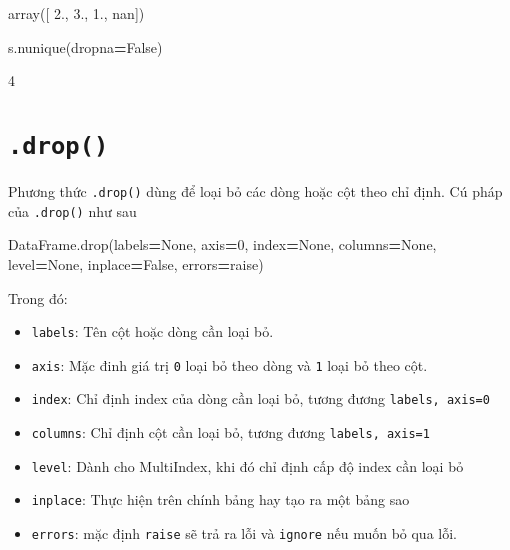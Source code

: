 \documentclass[
]{book}
\newenvironment{Shaded}{\begin{snugshade}}{\end{snugshade}}
\newcommand{\DecValTok}[1]{\textcolor[rgb]{0.00,0.00,0.81}{#1}}
\newcommand{\NormalTok}[1]{#1}
\newcommand{\OperatorTok}[1]{\textcolor[rgb]{0.81,0.36,0.00}{\textbf{#1}}}
\newcommand{\StringTok}[1]{\textcolor[rgb]{0.31,0.60,0.02}{#1}}
\newcommand{\VariableTok}[1]{\textcolor[rgb]{0.00,0.00,0.00}{#1}}
\begin{document}
\begin{Shaded}
\begin{Highlighting}[]
\NormalTok{array([ 2.,  3.,  1., nan])}
\end{Highlighting}
\end{Shaded}

\begin{Shaded}
\begin{Highlighting}[]
\NormalTok{s.nunique(dropna}\OperatorTok{=}\VariableTok{False}\NormalTok{)}
\end{Highlighting}
\end{Shaded}

\begin{Shaded}
\begin{Highlighting}[]
\NormalTok{4}
\end{Highlighting}
\end{Shaded}

\section{\texorpdfstring{\texttt{.drop()}}{.drop()}}\label{drop}

Phương thức \texttt{.drop()} dùng để loại bỏ các dòng hoặc cột theo chỉ định.
Cú pháp của \texttt{.drop()} như sau

\begin{Shaded}
\begin{Highlighting}[]
\NormalTok{DataFrame.drop(labels}\OperatorTok{=}\VariableTok{None}\NormalTok{, axis}\OperatorTok{=}\DecValTok{0}\NormalTok{, index}\OperatorTok{=}\VariableTok{None}\NormalTok{, columns}\OperatorTok{=}\VariableTok{None}\NormalTok{, level}\OperatorTok{=}\VariableTok{None}\NormalTok{, inplace}\OperatorTok{=}\VariableTok{False}\NormalTok{, errors}\OperatorTok{=}\StringTok{\textquotesingle{}raise\textquotesingle{}}\NormalTok{)}
\end{Highlighting}
\end{Shaded}

Trong đó:

\begin{itemize}
\item
  \texttt{labels}: Tên cột hoặc dòng cần loại bỏ.
\item
  \texttt{axis}: Mặc đinh giá trị \texttt{0} loại bỏ theo dòng và \texttt{1} loại bỏ theo cột.
\item
  \texttt{index}: Chỉ định index của dòng cần loại bỏ, tương đương \texttt{labels,\ axis=0}
\item
  \texttt{columns}: Chỉ định cột cần loại bỏ, tương đương \texttt{labels,\ axis=1}
\item
  \texttt{level}: Dành cho MultiIndex, khi đó chỉ định cấp độ index cần loại bỏ
\item
  \texttt{inplace}: Thực hiện trên chính bảng hay tạo ra một bảng sao
\item
  \texttt{errors}: mặc định \texttt{raise} sẽ trả ra lỗi và \texttt{ignore} nếu muốn bỏ qua lỗi.
\end{itemize}
\end{document}
